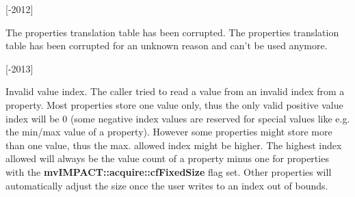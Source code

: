 \begin{Desc}
\begin{description}
{\bfseries }\mbox{[}-\/2012\mbox{]} \item[{\em 
\hypertarget{group___common_interface_gga61b0634ab285d9a2a303e0092167127ea1f18f11ce78f621ce859049ad9fee2b4}{P\+R\+O\+P\+H\+A\+N\+D\+L\+I\+N\+G\+\_\+\+P\+R\+O\+P\+\_\+\+T\+R\+A\+N\+S\+L\+A\+T\+I\+O\+N\+\_\+\+T\+A\+B\+L\+E\+\_\+\+C\+O\+R\+R\+U\+P\+T\+E\+D}\label{group___common_interface_gga61b0634ab285d9a2a303e0092167127ea1f18f11ce78f621ce859049ad9fee2b4}
}]The properties translation table has been corrupted. The properties translation table has been corrupted for an unknown reason and can't be used anymore.

{\bfseries }\mbox{[}-\/2013\mbox{]} \item[{\em 
\hypertarget{group___common_interface_gga61b0634ab285d9a2a303e0092167127eaf5f9d203ac2a0efa9027edd811a9db71}{P\+R\+O\+P\+H\+A\+N\+D\+L\+I\+N\+G\+\_\+\+P\+R\+O\+P\+\_\+\+V\+A\+L\+\_\+\+I\+D\+\_\+\+O\+U\+T\+\_\+\+O\+F\+\_\+\+B\+O\+U\+N\+D\+S}\label{group___common_interface_gga61b0634ab285d9a2a303e0092167127eaf5f9d203ac2a0efa9027edd811a9db71}
}]Invalid value index. The caller tried to read a value from an invalid index from a property. Most properties store one value only, thus the only valid positive value index will be 0 (some negative index values are reserved for special values like e.\+g. the min/max value of a property). However some properties might store more than one value, thus the max. allowed index might be higher. The highest index allowed will always be the value count of a property minus one for properties with the {\bfseries mv\+I\+M\+P\+A\+C\+T\+::acquire\+::cf\+Fixed\+Size} flag set. Other properties will automatically adjust the size once the user writes to an index out of bounds.


\end{description}
\end{Desc}
